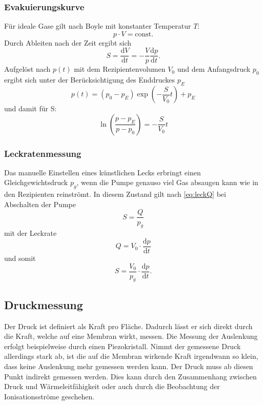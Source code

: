 \subsubsection{Evakuierungskurve}
Für ideale Gase gilt nach Boyle mit konstanter Temperatur $T$:
\begin{equation*}
    p\cdot V = \text{const.}
\end{equation*}
Durch Ableiten nach der Zeit ergibt sich
\begin{equation*}
    S = \frac{\text{d}V}{\text{d}t} = -\frac{V}{p}\frac{\text{d}p}{\text{d}t}.
\end{equation*}
Aufgelöst nach $p(t)$ mit dem Rezipientenvolumen $V_0$ und dem Anfangsdruck $p_0$ ergibt sich unter der Berücksichtigung des Enddruckes $p_E$
\begin{equation*}
    p(t)=(p_0-p_E)\exp\left(-\frac{S}{V_0}t\right) + p_E
\end{equation*}
und damit für S:
\begin{equation}
    \ln\left(\frac{p-p_E}{p-p_0}\right) = -\frac{S}{V_0}t
    \label{eq:evacSaug}
\end{equation}

\subsubsection{Leckratenmessung}
Das manuelle Einstellen eines künstlichen Lecks erbringt einen Gleichgewichtsdruck $p_g$, wenn die Pumpe genauso viel Gas absaugen kann wie in den Rezipienten reinströmt.
In diesem Zustand gilt nach \autoref{eq:leckQ} bei Abschalten der Pumpe
\begin{equation*}
    S = \frac{Q}{p_g}
\end{equation*}
mit der Leckrate
\begin{equation*}
    Q = V_0 \cdot\frac{\text{d}p}{\text{d}t}
\end{equation*}
und somit
\begin{equation}
    S = \frac{V_0}{p_g}\cdot\frac{\text{d}p}{\text{d}t}.
    \label{eq:leckSaug}
\end{equation}



\subsection{Druckmessung}
Der Druck ist definiert als Kraft pro Fläche.
Dadurch lässt er sich direkt durch die Kraft, 
welche auf eine Membran wirkt, messen.
Die Messung der Auslenkung erfolgt beispielweise durch einen Piezokristall.
Nimmt der gemessene Druck allerdings stark ab,
ist die auf die Membran wirkende Kraft irgendwann so klein, 
dass keine Auslenkung mehr gemessen werden kann.
Der Druck muss ab diesen Punkt indirekt gemessen werden.
Dies kann durch den Zusammenhang zwischen Druck und Wärmeleitfähigkeit
oder auch durch die Beobachtung der Ionisationsströme geschehen.

